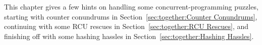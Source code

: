 
%


This chapter gives a few hints on handling some concurrent-programming
puzzles, starting with counter conundrums in
Section~\ref{sec:together:Counter Conundrums},
continuing with some RCU rescues in
Section~\ref{sec:together:RCU Rescues},
and finishing off with some hashing hassles in
Section~\ref{sec:together:Hashing Hassles}.





